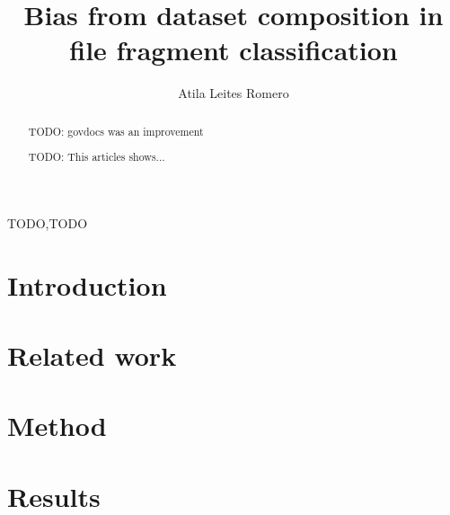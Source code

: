 \documentclass[review]{elsarticle}
\begin{document}
\begin{frontmatter}

\title{Bias from dataset composition in file fragment classification}

\author[mymainaddress,mysecondaryaddress]{Atila Leites Romero}

\address[mymainaddress]{PUC}
\address[mysecondaryaddress]{Brazilian Federal Police, Av Ipiranga 1365, Porto Alegre/RS, Brazil}






\begin{abstract}
TODO: govdocs was an improvement

TODO: This articles shows...
\end{abstract}

\begin{keyword}
TODO\sep TODO
\end{keyword}

\end{frontmatter}

\linenumbers

\section{Introduction}


\section{Related work}


\section{Method}


\section{Results}

\end{document}
